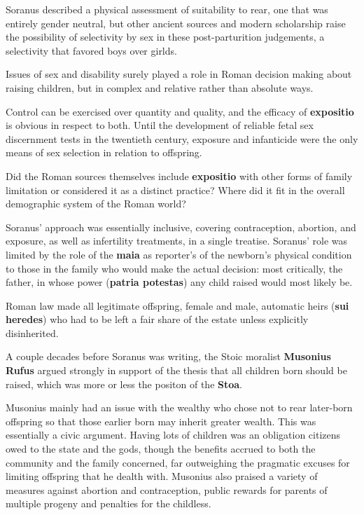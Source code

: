 \begin{rmk}
    Soranus described a physical assessment of suitability to rear, one that was entirely gender neutral, but other ancient sources and modern scholarship raise the possibility of selectivity by sex in these post-parturition judgements, a selectivity that favored boys over girlds.
\end{rmk}

Issues of sex and disability surely played a role in Roman decision making about raising children, but in complex and relative rather than absolute ways.

Control can be exercised over quantity and quality, and the efficacy of \textbf{expositio} is obvious in respect to both. Until the development of reliable fetal sex discernment tests in the twentieth century, exposure and infanticide were the only means of sex selection in relation to offspring. 

\begin{qst}
    Did the Roman sources themselves include \textbf{expositio} with other forms of family limitation or considered it as a distinct practice? Where did it fit in the overall demographic system of the Roman world?
\end{qst}

Soranus' approach was essentially inclusive, covering contraception, abortion, and exposure, as well as infertility treatments, in a single treatise. Soranus' role was limited by the role of the \textbf{maia} as reporter's of the newborn's physical condition to those in the family who would make the actual decision: most critically, the father, in whose power (\textbf{patria potestas}) any child raised would most likely be.

Roman law made all legitimate offspring, female and male, automatic heirs (\textbf{sui heredes}) who had to be left a fair share of the estate unless explicitly disinherited.

\begin{nte}
    A couple decades before Soranus was writing, the Stoic moralist \textbf{Musonius Rufus} argued strongly in support of the thesis that all children born should be raised, which was more or less the positon of the \textbf{Stoa}.
\end{nte}

Musonius mainly had an issue with the wealthy who chose not to rear later-born offspring so that those earlier born may inherit greater wealth. This was essentially a civic argument. Having lots of children was an obligation citizens owed to the state and the gods, though the benefits accrued to both the community and the family concerned, far outweighing the pragmatic excuses for limiting offspring that he dealth with. Musonius also praised a variety of measures against abortion and contraception, public rewards for parents of multiple progeny and penalties for the childless.

